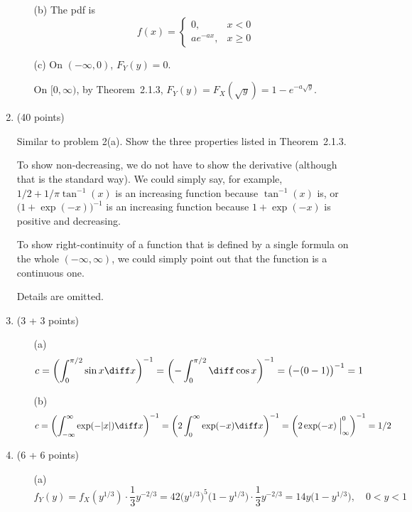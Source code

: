 \documentclass[12pt]{article}
\begin{document}
\begin{enumerate}
\begin{enumerate}
\item[(b)]
The pdf is
\[
f(x) = \begin{cases}
    0,          & x < 0\\
    a e^{-ax},  & x \ge 0
\end{cases}
\]

\item[(c)]
On $(-\infty, 0)$,
$F_Y(y) = 0$.

On $[0, \infty)$, by Theorem~2.1.3,
$
F_Y(y)
= F_X(\sqrt{y})
= 1 - e^{-a\sqrt{y}}
$.
\end{enumerate}

\item (40 points)

Similar to problem 2(a). Show the three properties listed in
Theorem~2.1.3.

To show non-decreasing, we do not have to show the derivative (although
that is the standard way). We could simply say, for example,
$1/2 + 1/\pi \tan^{-1}(x)$ is an increasing function because
$\tan^{-1}(x)$ is,
or $\bigl(1 + \exp(-x)\bigr)^{-1}$ is an increasing function
because $1 + \exp(-x)$ is positive and decreasing.

To show right-continuity of a function that is defined by a single
formula on the whole $(-\infty, \infty)$,
we could simply point out that the function is a continuous one.

Details are omitted.

\item (3 + 3 points)

\begin{enumerate}
\item[(a)]
\[
c
= \biggl(\int_{0}^{\pi/2} \sin x\diff x\biggr)^{-1}
= \biggl(-\int_{0}^{\pi/2} \diff \cos x\biggr)^{-1}
= \bigl(-(0 - 1)\bigr)^{-1}
= 1
\]
\item[(b)]
\[
c
= \biggl(\int_{-\infty}^{\infty} \exp(-|x|) \diff x\biggr)^{-1}
= \biggl(2\int_{0}^{\infty} \exp(-x)\diff x\biggr)^{-1}
= \biggl(2\exp(-x)\Bigm|_{\infty}^0\biggr)^{-1}
= 1/2
\]

\end{enumerate}

\item (6 + 6 points)

\begin{enumerate}
\item[(a)]
\[
f_Y(y)
= f_X(y^{1/3}) \cdot \frac{1}{3} y^{-2/3}
= 42\bigl(y^{1/3}\bigr)^5 \bigl(1 - y^{1/3}\bigr)
    \cdot \frac{1}{3} y^{-2/3}
= 14y\bigl(1 - y^{1/3}\bigr)
,\quad
0 < y < 1
\]


\end{enumerate}
\end{enumerate}
\end{document}
